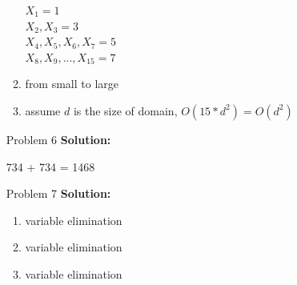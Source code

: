 \normalfont\documentclass[letterpaper,11pt]{article}
\begin{document}
\begin{enumerate}
\begin{enumerate}
		$X_1 = 1$ \\
		$X_2,X_3 = 3$ \\
		$X_4,X_5,X_6,X_7 = 5$ \\
		$X_8,X_9,...,X_{15} = 7$
		\item from small to large
		\item assume $d$ is the size of domain, $O(15 * d^2) = O(d^2)$
	\end{enumerate}
\item[Problem 6]\textbf{Solution:}\par
	734 + 734 = 1468
\item[Problem 7]\textbf{Solution:}\par
	\begin{enumerate}
		\item variable elimination
		\item variable elimination
		\item variable elimination
	\end{enumerate}


\end{enumerate}
\end{document}
